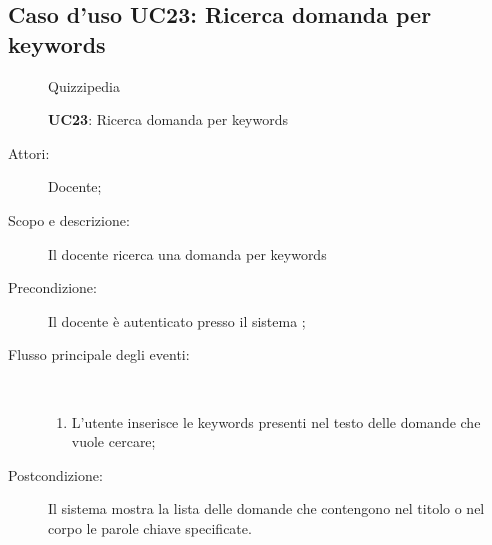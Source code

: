 \subsection{Caso d'uso UC23: Ricerca domanda per keywords}
	\begin{figure}[H]
		\centering
		\begin{resizedtikzpicture}{\textwidth}
		\begin{umlsystem}[x=0, fill=lightgray!20]{Quizzipedia}
		\end{umlsystem}
		\end{resizedtikzpicture}
		\caption{\textbf{UC23}: Ricerca domanda per keywords}
		\label{UC23}
	\end{figure}
\begin{description}
\item[Attori:] Docente;
\item[Scopo e descrizione:] Il docente  ricerca una domanda per keywords

      \item[Precondizione:] Il docente è autenticato presso il sistema
;

        \item[Flusso principale degli eventi:] \ 
 \begin{enumerate}
          \item L'utente inserisce le keywords presenti nel testo delle domande che vuole cercare;

      \end{enumerate}
    \item[Postcondizione:] Il sistema mostra la lista delle domande che contengono nel titolo o nel corpo le parole chiave specificate.
  \end{description}
\hypertarget{UC24}{}
